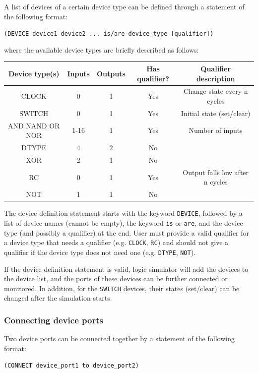 \documentclass[10pt,a4paper]{article}
\begin{document}
A list of devices of a certain device type can be defined through a
statement of the following format:

\texttt{(DEVICE device1 device2 ... is/are device\_type [qualifier])}

where the available device types are briefly described as follows:
\begin{center}
\begin{tabular}{|c|c|c|c|c|}
\hline
Device type(s) & Inputs & Outputs & Has qualifier? & Qualifier description\\
\hline
CLOCK & 0 & 1 & Yes & Change state every n cycles\\
SWITCH & 0 & 1 & Yes & Initial state (set/clear)\\
AND NAND OR NOR & 1-16 & 1 & Yes & Number of inputs\\
DTYPE & 4 & 2 & No & \\
XOR & 2 & 1 & No & \\
RC & 0 & 1 & Yes & Output falls low after n cycles\\
NOT & 1 & 1 & No & \\
\hline
\end{tabular}
\end{center}

The device definition statement starts with the keyword \texttt{DEVICE},
followed by a list of device names (cannot be empty), the keyword \texttt{is}
or \texttt{are}, and the device type (and possibly a qualifier) at the end.
User must provide a valid qualifier for a device type that needs a
qualifier (e.g. \texttt{CLOCK}, \texttt{RC}) and should not give a qualifier if the
device type does not need one (e.g. \texttt{DTYPE}, \texttt{NOT}).

If the device definition statement is valid, logic simulator will add
the devices to the device list, and the ports of these devices can be
further connected or monitored. In addition, for the \texttt{SWITCH}
devices, their states (set/clear) can be changed after the simulation
starts.

\subsubsection{Connecting device ports}
\label{sec:orgacf2577}
\label{org9cea803}

Two device ports can be connected together by a statement of the
following format:

\texttt{(CONNECT device\_port1 to device\_port2)}
\end{document}
